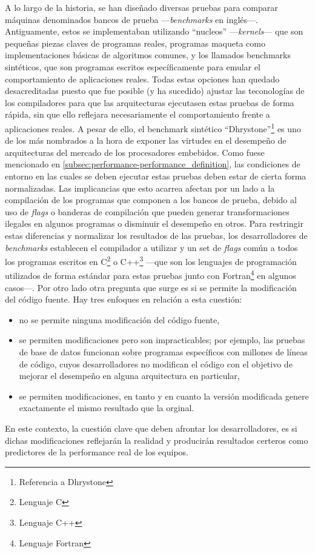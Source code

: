 A lo largo de la historia, se han diseñado diversas pruebas para comparar 
máquinas denominados bancos de prueba ---\emph{benchmarks} en inglés---. 
Antiguamente, estos se implementaban utilizando ``nucleos'' 
---\emph{kernels}--- que son pequeñas piezas claves de programas reales, 
programas maqueta como implementaciones básicas de algoritmos comunes, y los 
llamados benchmarks sintéticos, que son programas escritos específicamente para 
emular el comportamiento de aplicaciones reales. Todas estas opciones han 
quedado desacreditadas puesto que fue posible (y ha sucedido) ajustar las 
teconologías de los compiladores para que las arquitecturas ejecutasen estas 
pruebas de forma rápida, sin que ello reflejara necesariamente el 
comportamiento frente a aplicaciones reales. A pesar de ello, el benchmark 
sintético ``Dhrystone''\footnote{Referencia a Dhrystone} es uno de los más 
nombrados a la hora de exponer las virtudes en el desempeño de arquitecturas 
del mercado de los procesadores embebidos. Como fuese mencionado en 
\ref{subsec:performance-performance_definition}, las condiciones de entorno en 
las cuales se deben ejecutar estas pruebas deben estar de cierta forma 
normalizadas. Las implicancias que esto acarrea afectan por un lado a la 
compilación de los programas que componen a los bancos de prueba, debido al uso 
de \emph{flags} o banderas de compilación que pueden generar transformaciones 
ilegales en algunos programas o disminuir el desempeño en otros. Para 
restringir estas diferencias y normalizar los resultados de las pruebas, los 
desarrolladores de \emph{benchmarks} establecen el compilador a utilizar y un 
set de \emph{flags} común a todos los programas escritos en C\footnote{Lenguaje 
C} o C++\footnote{Lenguaje C++} ---que son los lenguajes de programación 
utilizados de forma estándar para estas pruebas junto con 
Fortran\footnote{Lenguaje Fortran} en algunos casos---. Por otro lado otra 
pregunta que surge es si se permite la modificación del código fuente. Hay tres 
enfoques en relación a esta cuestión:
\begin{itemize}
  \item no se permite ninguna modificación del código fuente,
  \item se permiten modificaciones pero son impracticables; por ejemplo, las 
pruebas de base de datos funcionan sobre programas específicos con millones de 
líneas de código, cuyos desarrolladores no modifican el código con el objetivo 
de mejorar el desempeño en alguna arquitectura en particular,
  \item se permiten modificaciones, en tanto y en cuanto la versión modificada 
genere exactamente el mismo resultado que la orginal.
\end{itemize}
En este contexto, la cuestión clave que deben afrontar los desarrolladores, es 
si dichas modificaciones reflejarán la realidad y producirán resultados 
certeros como predictores de la performance real de los equipos.


